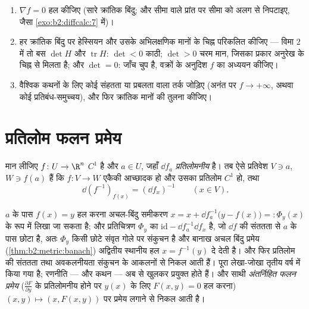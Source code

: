 \begin{method}\label{met:b2:diffcalc:extrema}
\begin{enumerate}
  \item $\nabla f = 0$ हल कीजिए (सारे क्रांतिक बिंदु; और सीमा वाले प्रांत पर सीमा
        को अलग से निपटाइए, जैसा \cref{exo:b2:diffcalc:7} में)।
  \item हर क्रांतिक बिंदु पर हेस्सियन और उसके अभिलक्षणिक मानों के चिह्न
        परिकलित कीजिए --- विमा $2$ में तो बस $\det H$ और $\operatorname{tr} H$: $\det < 0$ काठी; $\det >
        0$
        चरम मान, जिसका प्रकार अनुरेख के चिह्न से मिलता है; और $\det = 0$: जाँच
        चुप है, वक्रों के अनुदिश $f$ का अध्ययन कीजिए।
  \item वैश्विक कथनों के लिए कोई संहतता या प्रबलता वाला तर्क जोड़िए (अनंत
        पर $f \to +\infty$, अथवा कोई  प्रतिबंध-समुच्चय), और फिर क्रांतिक मानों की
        तुलना कीजिए।
\end{enumerate}
\end{method}

\section{प्रतिलोम फलन प्रमेय}

\begin{theorem}[प्रतिलोम फलन प्रमेय]\label{thm:b2:diffcalc:inverse}
मान लीजिए $f \colon U \to \R^n$ $C^1$ है और $a \in U$, जहाँ $\dd f_a$ \emph{प्रतिलोमनीय} है। तब ऐसे 
प्रतिवेश $V \ni a$, $W
\ni f(a)$ हैं कि $f \colon V \to W$ एकैकी आच्छादक हो और उसका प्रतिलोम $C^1$ हो, तथा
\[
\dd (f^{-1})_{f(x)} = (\dd f_x)^{-1} \qquad (x \in V).
\]
\end{theorem}
\admitted

\begin{remark}
$a$ के पास $f(x) = y$ हल करना अचल-बिंदु समीकरण $x = x + \dd f_a^{-1}\bigl(y - f(x)\bigr) =: \Phi_y(x)$ के रूप में लिखा जा सकता है;
और प्रतिचित्रण $\Phi_y$ का  $\mathrm{id} - \dd f_a^{-1}\dd f_x$ है, जो $\dd f$ की संततता से $a$ के पास छोटा
है, अतः $\Phi_y$ किसी छोटे संवृत गोले पर संकुचन है और बानाख अचल बिंदु प्रमेय
(\cref{thm:b2:metric:banach}) अद्वितीय स्थानीय हल $x = f^{-1}(y)$ दे देती है। और फिर प्रतिलोम की संततता तथा
अवकलनीयता संकुचन के आकलनों से निकल आती हैं। पूरा लेखा-जोखा तृतीय वर्ष में
किया गया है; रणनीति --- और कथन --- अब से खुलकर प्रयुक्त होते हैं। और साथी
\emph{अंतर्निहित फलन प्रमेय} ($\frac{\partial F}{\partial y}$ के प्रतिलोमनीय होने पर $y(x)$ के लिए $F(x, y) = 0$
हल करना) $(x, y) \mapsto (x, F(x,y))$ पर प्रमेय लगाने से निकल आती है।
\end{remark}

